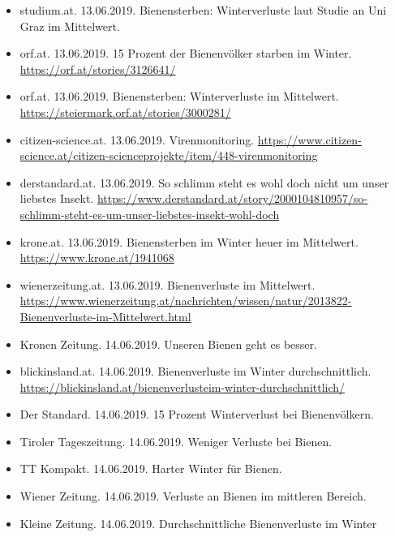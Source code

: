 \begin{itemize}

    \item
    studium.at. 13.06.2019. Bienensterben: Winterverluste laut Studie an Uni Graz im Mittelwert.

    \item
    orf.at. 13.06.2019. 15 Prozent der Bienenvölker starben im Winter. \url{https://orf.at/stories/3126641/}

    \item
    orf.at. 13.06.2019. Bienensterben: Winterverluste im Mittelwert. \url{https://steiermark.orf.at/stories/3000281/}

    \item
    citizen-science.at. 13.06.2019. Virenmonitoring. \url{https://www.citizen-science.at/citizen-scienceprojekte/item/448-virenmonitoring}

    \item
    derstandard.at. 13.06.2019. So schlimm steht es wohl doch nicht um unser liebstes Insekt. \url{https://www.derstandard.at/story/2000104810957/so-schlimm-steht-es-um-unser-liebstes-insekt-wohl-doch}

    \item
    krone.at. 13.06.2019. Bienensterben im Winter heuer im Mittelwert. \url{https://www.krone.at/1941068}

    \item
    wienerzeitung.at. 13.06.2019. Bienenverluste im Mittelwert. \url{https://www.wienerzeitung.at/nachrichten/wissen/natur/2013822-Bienenverluste-im-Mittelwert.html}

    \item
    Kronen Zeitung. 14.06.2019. Unseren Bienen geht es besser.

    \item
    blickinsland.at. 14.06.2019. Bienenverluste im Winter durchschnittlich. \url{https://blickinsland.at/bienenverlusteim-winter-durchschnittlich/}

    \item
    Der Standard. 14.06.2019. 15 Prozent Winterverlust bei Bienenvölkern.

    \item
    Tiroler Tageszeitung. 14.06.2019. Weniger Verluste bei Bienen.

    \item
    TT Kompakt. 14.06.2019. Harter Winter für Bienen.

    \item
    Wiener Zeitung. 14.06.2019. Verluste an Bienen im mittleren Bereich.

    \item
    Kleine Zeitung. 14.06.2019. Durchschnittliche Bienenverluste im Winter

\end{itemize}